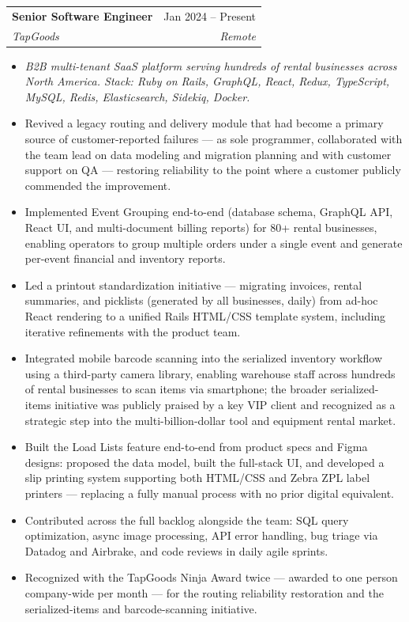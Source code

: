 \documentclass[letterpaper,11pt]{article}
\makeatletter
\newcommand{\resumeItem}[1]{
  \item\small{#1 \vspace{-2pt}}
}
\newcommand{\resumeSubheading}[4]{
  \vspace{-2pt}\item
    \begin{tabular*}{0.97\textwidth}[t]{l@{\extracolsep{\fill}}r}
      \textbf{#1} & #2 \\
      \textit{\small#3} & \textit{\small #4} \\
    \end{tabular*}\vspace{-7pt}
}
\newcommand{\resumeDescription}[1]{%
  \begin{itemize}[leftmargin=0.15in, label={}]
    \item\small{\textit{#1}}
  \end{itemize}\vspace{-10pt}
}
\newcommand{\resumeItemListStart}{\begin{itemize}}
\newcommand{\resumeItemListEnd}{\end{itemize}\vspace{-5pt}}
\makeatother
\begin{document}
  \resumeSubheading
    {Senior Software Engineer}{Jan 2024 -- Present}
    {TapGoods}{Remote}
  \resumeDescription{B2B multi-tenant SaaS platform serving hundreds of rental businesses across North America. Stack: Ruby on Rails, GraphQL, React, Redux, TypeScript, MySQL, Redis, Elasticsearch, Sidekiq, Docker.}
  \resumeItemListStart
    \resumeItem{Revived a legacy routing and delivery module that had become a primary source of customer-reported failures --- as sole programmer, collaborated with the team lead on data modeling and migration planning and with customer support on QA --- restoring reliability to the point where a customer publicly commended the improvement.}
    \resumeItem{Implemented Event Grouping end-to-end (database schema, GraphQL API, React UI, and multi-document billing reports) for 80+ rental businesses, enabling operators to group multiple orders under a single event and generate per-event financial and inventory reports.}
    \resumeItem{Led a printout standardization initiative --- migrating invoices, rental summaries, and picklists (generated by all businesses, daily) from ad-hoc React rendering to a unified Rails HTML/CSS template system, including iterative refinements with the product team.}
    \resumeItem{Integrated mobile barcode scanning into the serialized inventory workflow using a third-party camera library, enabling warehouse staff across hundreds of rental businesses to scan items via smartphone; the broader serialized-items initiative was publicly praised by a key VIP client and recognized as a strategic step into the multi-billion-dollar tool and equipment rental market.}
    \resumeItem{Built the Load Lists feature end-to-end from product specs and Figma designs: proposed the data model, built the full-stack UI, and developed a slip printing system supporting both HTML/CSS and Zebra ZPL label printers --- replacing a fully manual process with no prior digital equivalent.}
    \resumeItem{Contributed across the full backlog alongside the team: SQL query optimization, async image processing, API error handling, bug triage via Datadog and Airbrake, and code reviews in daily agile sprints.}
    \resumeItem{Recognized with the TapGoods Ninja Award twice --- awarded to one person company-wide per month --- for the routing reliability restoration and the serialized-items and barcode-scanning initiative.}
  \resumeItemListEnd
\end{document}
